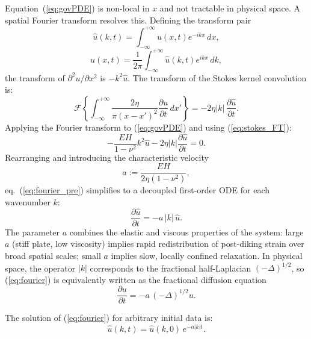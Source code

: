 \documentclass[extra]{gji}
\begin{document}
Equation~(\ref{eq:govPDE}) is non-local in $x$ and not tractable in physical
space. A spatial Fourier transform resolves this. Defining the transform pair
\begin{equation*}
\hat{u}(k,t) = \int_{-\infty}^{+\infty}u(x,t)e^{-ikx}\,dx,
\end{equation*}
\begin{equation*}
u(x,t) = \frac{1}{2\pi}\int_{-\infty}^{+\infty}\hat{u}(k,t)e^{ikx}\,dk,
\end{equation*}
the transform of $\partial^2 u/\partial x^2$ is $-k^2\hat{u}$. The transform
of the Stokes kernel convolution is:
\begin{equation}
\mathcal{F}\!\left\{
  \int_{-\infty}^{+\infty}\frac{2\eta}{\pi(x-x')^2}
  \frac{\partial u}{\partial t}\,dx'
\right\} = -2\eta|k|\,\frac{\partial\hat{u}}{\partial t}.
\label{eq:stokes_FT}
\end{equation}
Applying the Fourier transform to (\ref{eq:govPDE}) and using
(\ref{eq:stokes_FT}):
\begin{equation}
-\frac{EH}{1-\nu^2}k^2\hat{u} - 2\eta|k|\frac{\partial\hat{u}}{\partial t} = 0.
\label{eq:fourier_pre}
\end{equation}
Rearranging and introducing the characteristic velocity
\begin{equation}
a := \frac{EH}{2\eta(1-\nu^2)},
\label{eq:a}
\end{equation}
eq.~(\ref{eq:fourier_pre}) simplifies to a decoupled first-order ODE for
each wavenumber $k$:
\begin{equation}
\frac{\partial\hat{u}}{\partial t} = -a\,|k|\,\hat{u}.
\label{eq:fourier}
\end{equation}
The parameter $a$ combines the elastic and viscous properties of the system:
large $a$ (stiff plate, low viscosity) implies rapid redistribution of
post-diking strain over broad spatial scales; small $a$ implies slow, locally
confined relaxation. In physical space, the operator $|k|$ corresponds to the
fractional half-Laplacian $(-\Delta)^{1/2}$, so (\ref{eq:fourier}) is
equivalently written as the fractional diffusion equation
\citep{metzler2000random,samko1993integration,samko1993fractional}
\begin{equation}
\frac{\partial u}{\partial t} = -a\,(-\Delta)^{1/2}u.
\label{eq:fractional}
\end{equation}

The solution of (\ref{eq:fourier}) for arbitrary initial data is:
\begin{equation}
\hat{u}(k,t) = \hat{u}(k,0)\,e^{-a|k|t}.
\label{eq:fourier_sol}
\end{equation}
\end{document}

